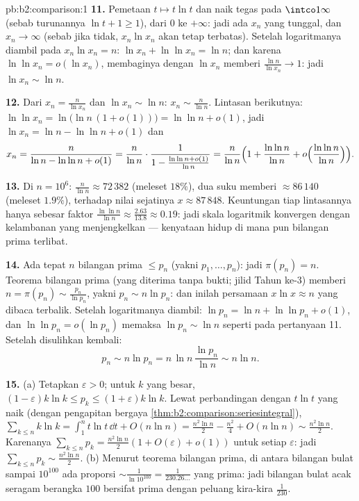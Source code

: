 \begin{solution}{pb:b2:comparison:1}
\textbf{11.} Pemetaan $t \mapsto t\ln t$  dan naik
tegas pada $\intco1\infty$ (sebab turunannya $\ln t + 1 \geq 1$),
dari $0$ ke $+\infty$: jadi ada $x_n$ yang tunggal, dan $x_n \to
\infty$ (sebab jika tidak, $x_n\ln x_n$ akan tetap terbatas). Setelah
logaritmanya diambil pada $x_n\ln x_n = n$: $\ln x_n + \ln\ln x_n = \ln
n$; dan karena $\ln\ln x_n = o(\ln x_n)$, membaginya dengan $\ln x_n$
memberi $\frac{\ln n}{\ln x_n} \to 1$: jadi $\ln x_n \sim \ln n$.

\textbf{12.} Dari $x_n = \frac{n}{\ln x_n}$ dan $\ln x_n \sim
\ln n$: $x_n \sim \frac{n}{\ln n}$. Lintasan berikutnya: $\ln\ln x_n =
\ln\bigl(\ln n\,(1 + o(1))\bigr) = \ln\ln n + o(1)$, jadi $\ln
x_n = \ln n - \ln\ln n + o(1)$ dan
\[
x_n = \frac{n}{\ln n - \ln\ln n + o(1)}
= \frac{n}{\ln n}\cdot\frac{1}{1 - \frac{\ln\ln n +
o(1)}{\ln n}}
= \frac{n}{\ln n}\Bigl(1 + \frac{\ln\ln n}{\ln n} +
o\Bigl(\frac{\ln\ln n}{\ln n}\Bigr)\Bigr).
\]

\textbf{13.} Di $n = 10^6$: $\frac{n}{\ln n} \approx 72\,382$
(meleset $18\%$), dua suku memberi $\approx 86\,140$ (meleset
$1.9\%$), terhadap nilai sejatinya $x \approx 87\,848$. Keuntungan tiap
lintasannya hanya sebesar faktor $\frac{\ln\ln n}{\ln n} \approx
\frac{2.63}{13.8} \approx 0.19$: jadi skala logaritmik konvergen
dengan kelambanan yang menjengkelkan --- kenyataan hidup di mana pun
bilangan prima terlibat.

\textbf{14.} Ada tepat $n$ bilangan prima $\leq p_n$ (yakni
$p_1, \dots, p_n$): jadi $\pi(p_n) = n$. Teorema bilangan prima
(yang diterima tanpa bukti; jilid Tahun ke-3) memberi $n = \pi(p_n) \sim
\frac{p_n}{\ln p_n}$, yakni $p_n \sim n\ln p_n$: dan inilah
persamaan $x\ln x \approx n$ yang dibaca terbalik. Setelah logaritmanya
diambil: $\ln p_n = \ln n + \ln\ln p_n + o(1)$, dan $\ln\ln p_n =
o(\ln p_n)$ memaksa $\ln p_n \sim \ln n$ seperti pada pertanyaan 11.
Setelah disulihkan kembali:
\[
p_n \sim n\ln p_n = n\,\ln n\,\frac{\ln p_n}{\ln n} \sim n\ln
n .
\]

\textbf{15.} (a) Tetapkan $\varepsilon > 0$; untuk $k$ yang besar, $(1 -
\varepsilon)k\ln k \leq p_k \leq (1 + \varepsilon)k\ln k$. Lewat
perbandingan dengan $t\ln t$ yang naik
(dengan pengapitan bergaya \cref{thm:b2:comparison:seriesintegral}),
$\sum_{k\leq n}k\ln k = \int_1^n t\ln t\,\dd t + O(n\ln n) =
\frac{n^2\ln n}2 - \frac{n^2}4 + O(n\ln n) \sim
\frac{n^2\ln n}2$. Karenanya $\sum_{k\leq n}p_k = \frac{n^2\ln
n}{2}(1 + O(\varepsilon) + o(1))$ untuk setiap $\varepsilon$:
jadi $\sum_{k\leq n}p_k \sim \frac{n^2\ln n}2$. (b) Menurut teorema
bilangan prima, di antara bilangan bulat sampai $10^{100}$ ada
proporsi $\sim \frac{1}{\ln 10^{100}} = \frac1{230.26\dots}$
yang prima: jadi bilangan bulat acak seragam berangka $100$ bersifat
prima dengan peluang kira-kira $\frac1{230}$.


\end{solution}
